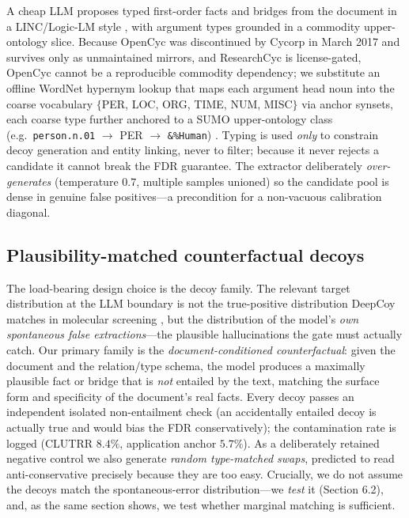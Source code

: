 \documentclass[11pt,letterpaper]{article}
\begin{document}
A cheap LLM proposes typed first-order facts and bridges from the document in a LINC/Logic-LM style \cite{Olausson2023, Pan2023}, with argument types grounded in a commodity upper-ontology slice. Because OpenCyc was discontinued by Cycorp in March 2017 and survives only as unmaintained mirrors, and ResearchCyc is license-gated, OpenCyc cannot be a reproducible commodity dependency; we substitute an offline WordNet \cite{Miller1995} hypernym lookup that maps each argument head noun into the coarse vocabulary $\{$PER, LOC, ORG, TIME, NUM, MISC$\}$ via anchor synsets, each coarse type further anchored to a SUMO upper-ontology class (e.g.\ \texttt{person.n.01} $\to$ PER $\to$ \texttt{\&\%Human}) \cite{Niles2001}. Typing is used \emph{only} to constrain decoy generation and entity linking, never to filter; because it never rejects a candidate it cannot break the FDR guarantee. The extractor deliberately \emph{over-generates} (temperature $0.7$, multiple samples unioned) so the candidate pool is dense in genuine false positives---a precondition for a non-vacuous calibration diagonal.

\subsection{Plausibility-matched counterfactual decoys}

The load-bearing design choice is the decoy family. The relevant target distribution at the LLM boundary is not the true-positive distribution DeepCoy matches in molecular screening \cite{Imrie2020}, but the distribution of the model's \emph{own spontaneous false extractions}---the plausible hallucinations the gate must actually catch. Our primary family is the \emph{document-conditioned counterfactual}: given the document and the relation/type schema, the model produces a maximally plausible fact or bridge that is \emph{not} entailed by the text, matching the surface form and specificity of the document's real facts. Every decoy passes an independent isolated non-entailment check (an accidentally entailed decoy is actually true and would bias the FDR conservatively); the contamination rate is logged (CLUTRR $8.4\%$, application anchor $5.7\%$). As a deliberately retained negative control we also generate \emph{random type-matched swaps}, predicted to read anti-conservative precisely because they are too easy. Crucially, we do not assume the decoys match the spontaneous-error distribution---we \emph{test} it (Section 6.2), and, as the same section shows, we test whether marginal matching is sufficient.
\end{document}
